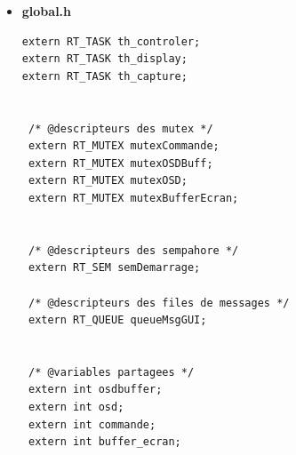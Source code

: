 \documentclass[11pt, a4paper]{paper}
\begin{document}
\begin{itemize}
\begin{lstlisting}
        jpegimage = d_new_jpegimage();
        d_jpegimage_compress(jpegimage,frame);
        message = d_new_message();
        d_message_put_jpeg_image(message,jpegimage);

        rt_printf("th_capture  : Envoie de l'image capturee \n");
        if (write_in_queue(&queueMsgGUI, message, sizeof (DMessage)) < 0) {message->free(message);}

    }
}


void th_display (void *arg)
{

  DImage *image_capturee;
  DMessage *message;
  DJpegimage *jpegimage;


  rt_printf ("th_display :  en attente de demarrage\n");
  rt_sem_p(&semDemarrage, TM_INFINITE);

  rt_printf("th_display : Demarrage Succes\n");


  while (1)
    {
        if ((err = rt_queue_read (&queueMsgGUI, &image_capturee, sizeof (DMessage), TM_INFINITE)) >= 0) {

            rt_mutex_acquire (&mutexOSD, TM_INFINITE); //osd_var := Read_data(osd)
            osd_var = osd;
            rt_mutex_release (&mutexOSD);

            img = encode(image_capturee, osd_var);

            rt_mutex_acquire (&mutexBufferEcran, TM_INFINITE); //osd_var := Read_data(osd)
            buffer_ecran = img;
            rt_mutex_release (&mutexBufferEcran);
      }
      else  {rt_printf ("th_display : Error msg queue write: %s\n", strerror (-err));}

    }
}

\end{lstlisting}

\item \large{\bf global.h}

\lstset{language=C} 
\begin{lstlisting}
extern RT_TASK th_controler;
extern RT_TASK th_display;
extern RT_TASK th_capture;


 /* @descripteurs des mutex */
 extern RT_MUTEX mutexCommande;
 extern RT_MUTEX mutexOSDBuff;
 extern RT_MUTEX mutexOSD;
 extern RT_MUTEX mutexBufferEcran;


 /* @descripteurs des sempahore */
 extern RT_SEM semDemarrage;
 
 /* @descripteurs des files de messages */
 extern RT_QUEUE queueMsgGUI;


 /* @variables partagees */
 extern int osdbuffer;
 extern int osd;
 extern int commande;
 extern int buffer_ecran;



\end{lstlisting}
\end{itemize}
\end{document}
